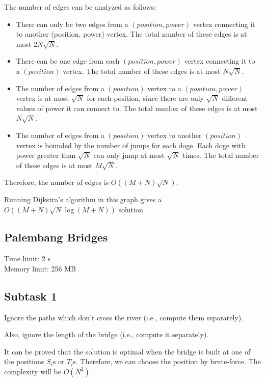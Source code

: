 \documentclass[a4paper]{article}
\begin{document}
The number of edges can be analyzed as follows:
\begin{itemize}

    \item There can only be two edges from a $(position, power)$ vertex connecting it to another (position, power) vertex. The total number of these edges is at most $2N\sqrt{N}$.
    \item There can be one edge from each $(position, power)$ vertex connecting it to a $(position)$ vertex. The total number of these edges is at most $N\sqrt{N}$.
    \item The number of edges from a $(position)$ vertex to a $(position, power)$ vertex is at most $\sqrt{N}$ for each position, since there are only $\sqrt{N}$ different values of power it can connect to. The total number of these edges is at most $N\sqrt{N}$.
    \item The number of edges from a $(position)$ vertex to another $(position)$ vertex is bounded by the number of jumps for each doge. Each doge with power greater than $\sqrt{N}$ can only jump at most $\sqrt{N}$ times. The total number of these edges is at most $M\sqrt{N}$.
\end{itemize}

Therefore, the number of edges is $O((M + N)\sqrt{N})$.

Running Dijkstra's algorithm in this graph gives a $O((M + N)\sqrt{N} \log(M + N))$ solution.

\newpage
\begin{center}
    \section*{Palembang Bridges}
    Time limit: 2 s\\
    Memory limit: 256 MB
\end{center}

\subsection*{Subtask 1}

Ignore the paths which don't cross the river (i.e., compute them separately).

Also, ignore the length of the bridge (i.e., compute it separately).

It can be proved that the solution is optimal when the bridge is built at one of the positions $S_i$s or $T_i$s. Therefore, we can choose the position by brute-force. The complexity will be $O(N^2)$.
\end{document}
